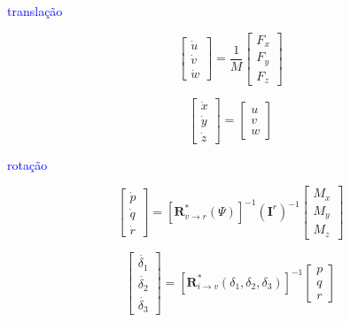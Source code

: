 \textcolor{blue}{translação}

\begin{equation}
    \begin{bmatrix} \dot{u} \\ \dot{v} \\ \dot{w} \end{bmatrix} = \frac{1}{M} \begin{bmatrix} F_x \\ F_y \\ F_z \end {bmatrix}
\end{equation}


\begin{equation}
    \begin{bmatrix} \dot{x} \\ \dot{y} \\ \dot{z} \end{bmatrix} = \begin{bmatrix} u \\ v \\ w \end{bmatrix}
\end{equation}


\textcolor{blue}{rotação}

\begin{equation}
    \begin{bmatrix} \dot{p} \\ \dot{q} \\ \dot{r} \end {bmatrix} = \left[\boldsymbol{R}^*_{v \rightarrow r}\left(\Psi\right)\right]^{-1} (\mathbf{I}^r)^{-1} \begin{bmatrix} M_x \\ M_y \\ M_z \end {bmatrix}
\end{equation}

\begin{equation}
    \begin{bmatrix} \dot{\delta_1} \\ \dot{\delta_2} \\ \dot{\delta_3} \end{bmatrix} = \left[\boldsymbol{R}^*_{i \rightarrow v} \left(\delta_1, \delta_2, \delta_3 \right)\right]^{-1} \begin{bmatrix} p \\ q \\ r \end{bmatrix}
\end{equation}

